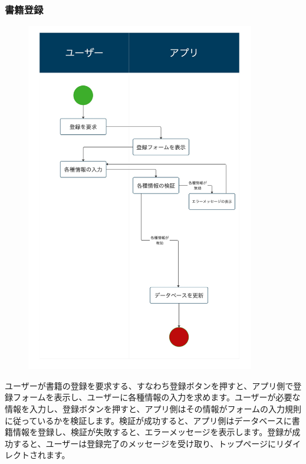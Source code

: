 \documentclass[a4paper, 11pt, titlepage]{jsarticle}
\begin{document}
\subsubsection{書籍登録}
\begin{figure}[h]
\centering
\includegraphics[width=100mm]{flow-touroku.jpg}
\label{fig:func}
\end{figure}

ユーザーが書籍の登録を要求する、すなわち登録ボタンを押すと、アプリ側で登録フォームを表示し、ユーザーに各種情報の入力を求めます。ユーザーが必要な情報を入力し、登録ボタンを押すと、アプリ側はその情報がフォームの入力規則に従っているかを検証します。検証が成功すると、アプリ側はデータベースに書籍情報を登録し、検証が失敗すると、エラーメッセージを表示します。登録が成功すると、ユーザーは登録完了のメッセージを受け取り、トップページにリダイレクトされます。
\clearpage
\end{document}

